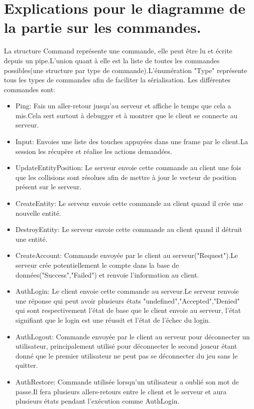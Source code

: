 \documentclass[french]{article}
\begin{document}
\section{Explications pour le diagramme de la partie sur les commandes.}
La structure Command représente une commande, elle peut être lu et écrite depuis un pipe.L'union quant à elle est la liste de toutes les commandes possibles(une structure par type de commande).L'énumération "Type" représente tous les types de commandes afin de faciliter la sérialisation. Les différentes commandes sont:
\newline
\begin{itemize}
    \item Ping: Fais un aller-retour jusqu'au serveur et affiche le temps que cela a mis.Cela sert surtout à debugger et à montrer que le client se connecte au serveur.
    \item Input: Envoies une liste des touches appuyées dans une frame par le client.La session les récupère et réalise les actions demandées.
    \item UpdateEntityPosition: Le serveur envoie cette commande au client une fois que les collisions sont résolues afin de mettre à jour le vecteur de position présent sur le serveur.
    \item CreateEntity: Le serveur envoie cette commande au client quand il crée une nouvelle entité.
    \item DestroyEntity: Le serveur envoie cette commande au client quand il détruit une entité.
    \item CreateAccount: Commande envoyée par le client au serveur("Request").Le serveur crée potentiellement le compte dans la base de données("Success","Failed") et renvoie l'information au client.
    \item AuthLogin: Le client envoie cette commande au serveur.Le serveur renvoie une réponse qui peut avoir plusieurs états "undefined","Accepted","Denied" qui sont respectivement l'état de base que le client envoie au serveur, l'état signifiant que le login est une réussit et l'état de l'échec du login.
    \item AuthLogout: Commande envoyée par le client au serveur pour déconnecter un utilisateur, principalement utilisé pour déconnecter le second joueur étant donné que le premier utilisateur ne peut pas se déconnecter du jeu sans le quitter.
    \item AuthRestore: Commande utilisée lorsqu'un utilisateur a oublié son mot de passe.Il fera plusieurs allers-retours entre le client et le serveur et aura plusieurs états pendant l'exécution comme AuthLogin.

\end{itemize}
\end{document}
